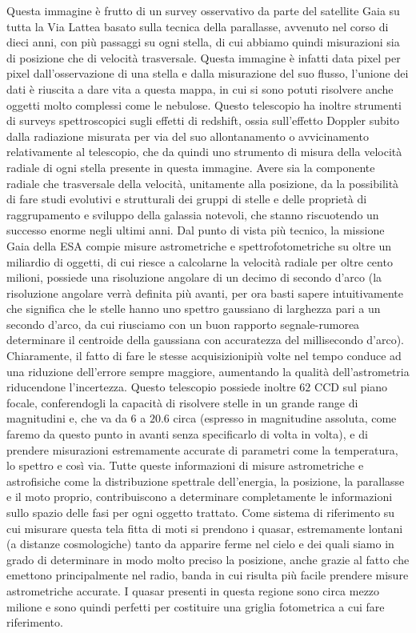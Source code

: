 \documentclass[a4paper,twoside,openany,notitlepage]{book}
\theoremstyle{definition}
\theoremstyle{plain}
\begin{document}
Questa immagine è frutto di un survey osservativo da parte del satellite Gaia su tutta la Via Lattea basato sulla tecnica della parallasse, avvenuto nel corso di dieci anni, con più passaggi su ogni stella, di cui abbiamo quindi misurazioni sia di posizione che di velocità trasversale. Questa immagine è infatti data pixel per pixel dall'osservazione di una stella e dalla misurazione del suo flusso, l'unione dei dati è riuscita a dare vita a questa mappa, in cui si sono potuti risolvere anche oggetti molto complessi come le nebulose. Questo telescopio ha inoltre strumenti di surveys spettroscopici sugli effetti di redshift, ossia sull'effetto Doppler subito dalla radiazione misurata per via del suo allontanamento o avvicinamento relativamente al telescopio, che da quindi uno strumento di misura della velocità radiale di ogni stella presente in questa immagine. Avere sia la componente radiale che trasversale della velocità, unitamente alla posizione, da la possibilità di fare studi evolutivi e strutturali dei gruppi di stelle e delle proprietà di raggrupamento e sviluppo della galassia notevoli, che stanno riscuotendo un successo enorme negli ultimi anni. Dal punto di vista più tecnico, la missione Gaia della ESA compie misure astrometriche e spettrofotometriche su oltre un miliardio di oggetti, di cui riesce a calcolarne la velocità radiale per oltre cento milioni, possiede una risoluzione angolare di un decimo di secondo d'arco (la risoluzione angolare verrà definita più avanti, per ora basti sapere intuitivamente che significa che le stelle hanno uno spettro gaussiano di larghezza pari a un secondo d'arco, da cui riusciamo con un buon rapporto segnale-rumorea determinare il centroide della gaussiana con accuratezza del millisecondo d'arco). Chiaramente, il fatto di fare le stesse acquisizionipiù volte nel tempo conduce ad una riduzione dell'errore sempre maggiore, aumentando la qualità dell'astrometria riducendone l'incertezza. Questo telescopio possiede inoltre $62$ CCD sul piano focale, conferendogli la capacità di risolvere stelle in un grande range di magnitudini e, che va da $6$ a $20.6$ circa (espresso in magnitudine assoluta, come faremo da questo punto in avanti senza specificarlo di volta in volta), e di prendere misurazioni estremamente accurate di parametri come la temperatura, lo spettro e così via. Tutte queste informazioni di misure astrometriche e astrofisiche come la distribuzione spettrale dell'energia, la posizione, la parallasse e il moto proprio, contribuiscono a determinare completamente le informazioni sullo spazio delle fasi per ogni oggetto trattato. Come sistema di riferimento su cui misurare questa tela fitta di moti si prendono i quasar, estremamente lontani (a distanze cosmologiche) tanto da apparire ferme nel cielo e dei quali siamo in grado di determinare in modo molto preciso la posizione, anche grazie al fatto che emettono principalmente nel radio, banda in cui risulta più facile prendere misure astrometriche accurate. I quasar presenti in questa regione sono circa mezzo milione e sono quindi perfetti per costituire una griglia fotometrica a cui fare riferimento.
\end{document}

